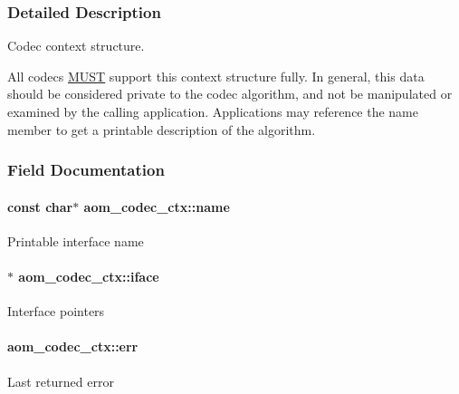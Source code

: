 \subsubsection{Detailed Description}
Codec context structure. 

All codecs \hyperlink{rfc2119_MUST}{M\+U\+ST} support this context structure fully. In general, this data should be considered private to the codec algorithm, and not be manipulated or examined by the calling application. Applications may reference the \textquotesingle{}name\textquotesingle{} member to get a printable description of the algorithm. 

\subsubsection{Field Documentation}
\paragraph[{\texorpdfstring{name}{name}}]{\setlength{\rightskip}{0pt plus 5cm}const char$\ast$ aom\+\_\+codec\+\_\+ctx\+::name}\hypertarget{structaom__codec__ctx_a3aa8abff3e05d2fbbf4f5a9fa0575f2b}{}\label{structaom__codec__ctx_a3aa8abff3e05d2fbbf4f5a9fa0575f2b}
Printable interface name 
\paragraph[{\texorpdfstring{iface}{iface}}]{$\ast$ aom\+\_\+codec\+\_\+ctx\+::iface}\hypertarget{structaom__codec__ctx_a49c3517c6879e8b57061496078cfd040}{}\label{structaom__codec__ctx_a49c3517c6879e8b57061496078cfd040}
Interface pointers 
\paragraph[{\texorpdfstring{err}{err}}]{ aom\+\_\+codec\+\_\+ctx\+::err}\hypertarget{structaom__codec__ctx_a4cf9c265a7c34e92bb02d04aa3cab718}{}\label{structaom__codec__ctx_a4cf9c265a7c34e92bb02d04aa3cab718}
Last returned error 
